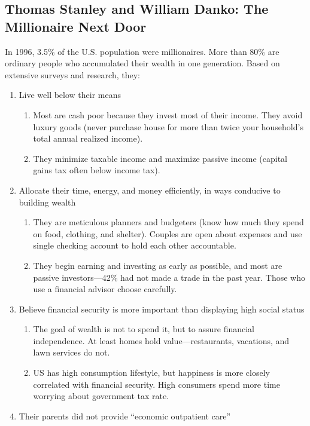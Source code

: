 \documentclass[
]{article}
\begin{document}
\hypertarget{thomas-stanley-and-william-danko-the-millionaire-next-door}{%
\subsection{Thomas Stanley and William Danko: The Millionaire Next
Door}\label{thomas-stanley-and-william-danko-the-millionaire-next-door}}

In 1996, 3.5\% of the U.S. population were millionaires. More than 80\%
are ordinary people who accumulated their wealth in one generation.
Based on extensive surveys and research, they:

\begin{enumerate}
\def\labelenumi{\arabic{enumi}.}
\item
  Live well below their means

  \begin{enumerate}
  \def\labelenumii{\arabic{enumii}.}
  \item
    Most are cash poor because they invest most of their income. They
    avoid luxury goods (never purchase house for more than twice your
    household's total annual realized income).
  \item
    They minimize taxable income and maximize passive income (capital
    gains tax often below income tax).
  \end{enumerate}
\item
  Allocate their time, energy, and money efficiently, in ways conducive
  to building wealth

  \begin{enumerate}
  \def\labelenumii{\arabic{enumii}.}
  \setcounter{enumii}{2}
  \item
    They are meticulous planners and budgeters (know how much they spend
    on food, clothing, and shelter). Couples are open about expenses and
    use single checking account to hold each other accountable.
  \item
    They begin earning and investing as early as possible, and most are
    passive investors---42\% had not made a trade in the past year.
    Those who use a financial advisor choose carefully.
  \end{enumerate}
\item
  Believe financial security is more important than displaying high
  social status

  \begin{enumerate}
  \def\labelenumii{\arabic{enumii}.}
  \setcounter{enumii}{4}
  \item
    The goal of wealth is not to spend it, but to assure financial
    independence. At least homes hold value---restaurants, vacations,
    and lawn services do not.
  \item
    US has high consumption lifestyle, but happiness is more closely
    correlated with financial security. High consumers spend more time
    worrying about government tax rate.
  \end{enumerate}
\item
  Their parents did not provide ``economic outpatient care''


\end{enumerate}
\end{document}
